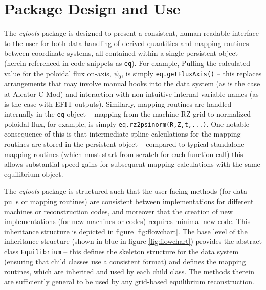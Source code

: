 \documentclass[12pt,floatfix,showpacs]{revtex4-1}
\newcommand{\gnote}[1]{\marginpar{\textcolor{red}{\scriptsize{#1}}}}
\begin{document}
\section{Package Design and Use}\label{sec:design}

The \emph{eqtools} package is designed to present a consistent, human-readable interface to the user for both data handling of derived quantities and mapping routines between coordinate systems, all contained within a single persistent object (herein referenced in code snippets as \verb|eq|).  For example, Pulling the calculated value for the poloidal flux on-axis, $\psi_0$, is simply \verb|eq.getFluxAxis()| -- this replaces arrangements that may involve manual hooks into the data system (as is the case at Alcator C-Mod) and interaction with non-intuitive internal variable names (as is the case with EFIT outputs\gnote{too harsh?}).  Similarly, mapping routines are handled internally in the \verb|eq| object -- mapping from the machine RZ grid to normalized poloidal flux, for example, is simply \verb|eq.rz2psinorm(R,Z,t,...)|.  One notable consequence of this is that intermediate spline calculations for the mapping routines are stored in the persistent object -- compared to typical standalone mapping routines (which must start from scratch for each function call) this allows substantial speed gains for subsequent mapping calculations with the same equilibrium object.

The \emph{eqtools} package is structured such that the user-facing methods (for data pulls or mapping routines) are consistent between implementations for different machines or reconstruction codes, and moreover that the creation of new implementations (for new machines or codes) requires minimal new code.  This inheritance structure is depicted in figure \ref{fig:flowchart}.  The base level of the inheritance structure (shown in blue in figure \ref{fig:flowchart}) provides the abstract class \verb|Equilibrium| -- this defines the skeleton structure for the data system (ensuring that child classes use a consistent format) and defines the mapping routines, which are inherited and used by each child class.  The methods therein are sufficiently general to be used by any grid-based equilibrium reconstruction.
\end{document}
